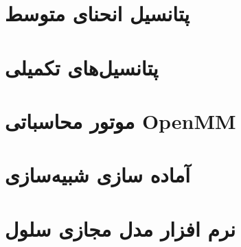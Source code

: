 \section{
پتانسیل انحنای متوسط
}



\section{
پتانسیل‌های تکمیلی
\label{sec:auxPotentials}
}




\section{
موتور محاسباتی
OpenMM
}


\section{
آماده سازی شبیه‌سازی
}


\section{
نرم افزار مدل مجازی سلول
}




